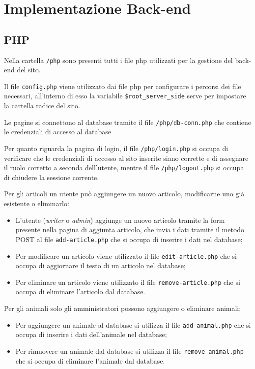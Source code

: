 \section{Implementazione Back-end}
\label{sec:back-end}

\subsection{PHP}
Nella cartella \texttt{/php} sono presenti tutti i file php utilizzati per la gestione del back-end del sito.

Il file \texttt{config.php} viene utilizzato dai file php per configurare i percorsi dei file necessari, all'interno di esso la variabile \texttt{\$root\_server\_side}
serve per impostare la cartella radice del sito.

Le pagine si connettono al database tramite il file \texttt{/php/db-conn.php} che contiene le credenziali di accesso al database

Per quanto riguarda la pagina di login, il file \texttt{/php/login.php} si occupa di verificare che le credenziali di accesso al sito inserite siano corrette
e di assegnare il ruolo corretto a seconda dell'utente, mentre il file \texttt{/php/logout.php} si occupa di chiudere la sessione corrente.

Per gli articoli un utente può aggiungere un nuovo articolo, modificarne uno già esistente o eliminarlo:

\begin{itemize}
    \item L'utente (\textit{writer} o \textit{admin}) aggiunge un nuovo articolo tramite la form presente nella pagina di aggiunta articolo, che invia i dati tramite il metodo POST al file \texttt{add-article.php} che si occupa di inserire i dati nel database;
    \item Per modificare un articolo viene utilizzato il file \texttt{edit-article.php} che si occupa di aggiornare il testo di un articolo nel database;
    \item Per eliminare un articolo viene utilizzato il file \texttt{remove-article.php} che si occupa di eliminare l'articolo dal database.
\end{itemize}

Per gli animali solo gli amministratori possono aggiungere o eliminare animali:

\begin{itemize}
    \item Per aggiungere un animale al database si utilizza il file \texttt{add-animal.php} che si occupa di inserire i dati dell'animale nel database;
    \item Per rimuovere un animale dal database si utilizza il file \texttt{remove-animal.php} che si occupa di eliminare l'animale dal database.
\end{itemize}

